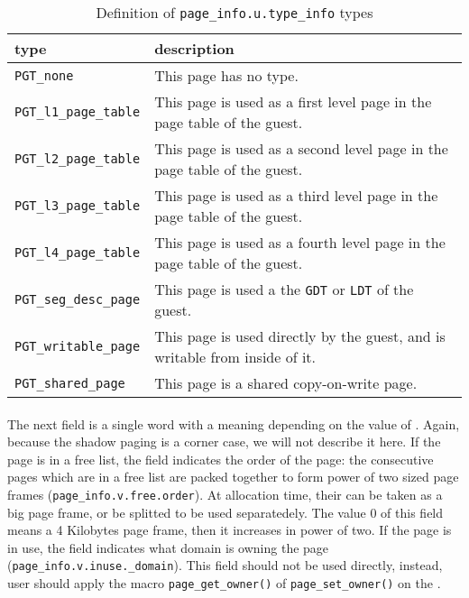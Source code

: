 \begin{table}
  \centering
  \begin{tabularx}{\textwidth}{ | l | X | }
    \hline
    type                          & description \\
    \hline
    \texttt{PGT\_none}            & This page has no type. \\
    \hline
    \texttt{PGT\_l1\_page\_table} & This page is used as a first level page
                                    in the page table of the guest. \\
    \hline
    \texttt{PGT\_l2\_page\_table} & This page is used as a second level page
                                    in the page table of the guest. \\
    \hline
    \texttt{PGT\_l3\_page\_table} & This page is used as a third level page
                                    in the page table of the guest. \\
    \hline
    \texttt{PGT\_l4\_page\_table} & This page is used as a fourth level page
                                    in the page table of the guest. \\
    \hline
    \texttt{PGT\_seg\_desc\_page} & This page is used a the \texttt{GDT} or
                                    \texttt{LDT} of the guest. \\
    \hline
    \texttt{PGT\_writable\_page}  & This page is used directly by the guest,
                                    and is writable from inside of it. \\
    \hline
    \texttt{PGT\_shared\_page}    & This page is a shared copy-on-write
                                    page. \\
    \hline
  \end{tabularx}
  \caption{\label{table page_info.type_info list}Definition of
    \texttt{page\_info.u.type\_info} types}
\end{table}

\paragraph{}
The next field is a single word with a meaning depending on the value of
\countinfo.
Again, because the shadow paging is a corner case, we will not describe it
here.
If the page is in a free list, the field indicates the order of the page:
the consecutive pages which are in a free list are packed together to form
power of two sized page frames (\texttt{page\_info.v.free.order}).
At allocation time, their can be taken as a big page frame, or be splitted to
be used separatedely.
The value 0 of this field means a 4 Kilobytes page frame, then it increases in
power of two.
If the page is in use, the field indicates what domain is owning the page
(\texttt{page\_info.v.inuse.\_domain}).
This field should not be used directly, instead, user should apply the macro
\texttt{page\_get\_owner()} of \texttt{page\_set\_owner()} on the \pageinfo.

